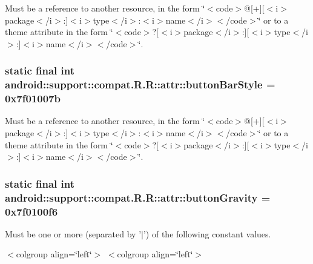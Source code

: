 Must be a reference to another resource, in the form \char`\"{}$<$code$>$@\mbox{[}+\mbox{]}\mbox{[}$<$i$>$package$<$/i$>$:\mbox{]}$<$i$>$type$<$/i$>$:$<$i$>$name$<$/i$>$$<$/code$>$\char`\"{} or to a theme attribute in the form \char`\"{}$<$code$>$?\mbox{[}$<$i$>$package$<$/i$>$:\mbox{]}\mbox{[}$<$i$>$type$<$/i$>$:\mbox{]}$<$i$>$name$<$/i$>$$<$/code$>$\char`\"{}. \hypertarget{classandroid_1_1support_1_1compat_1_1_r_1_1attr_74af0c3d8f79cc7d1c8ca5c1731c90a5}{
\subsubsection[{buttonBarStyle}]{\setlength{\rightskip}{0pt plus 5cm}static final int android::support::compat.R.R::attr::buttonBarStyle = 0x7f01007b}}
\label{classandroid_1_1support_1_1compat_1_1_r_1_1attr_74af0c3d8f79cc7d1c8ca5c1731c90a5}


Must be a reference to another resource, in the form \char`\"{}$<$code$>$@\mbox{[}+\mbox{]}\mbox{[}$<$i$>$package$<$/i$>$:\mbox{]}$<$i$>$type$<$/i$>$:$<$i$>$name$<$/i$>$$<$/code$>$\char`\"{} or to a theme attribute in the form \char`\"{}$<$code$>$?\mbox{[}$<$i$>$package$<$/i$>$:\mbox{]}\mbox{[}$<$i$>$type$<$/i$>$:\mbox{]}$<$i$>$name$<$/i$>$$<$/code$>$\char`\"{}. \hypertarget{classandroid_1_1support_1_1compat_1_1_r_1_1attr_57a6f39a64efa1152fd863ce1be94f71}{
\subsubsection[{buttonGravity}]{\setlength{\rightskip}{0pt plus 5cm}static final int android::support::compat.R.R::attr::buttonGravity = 0x7f0100f6}}
\label{classandroid_1_1support_1_1compat_1_1_r_1_1attr_57a6f39a64efa1152fd863ce1be94f71}


Must be one or more (separated by '$|$') of the following constant values. \begin{TabularC}{0}
\hline
\end{TabularC}
$<$colgroup align=\char`\"{}left\char`\"{}$>$ $<$colgroup align=\char`\"{}left\char`\"{}$>$ 

